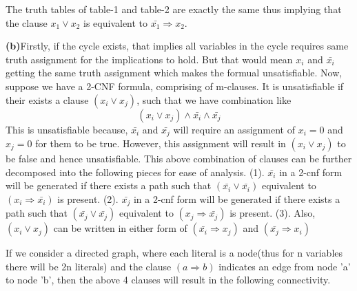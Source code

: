 \documentclass{article}
\renewcommand\part[1]{\vspace{.10in}\textbf{(#1)}}
\begin{document}
  The truth tables of table-1 and table-2 are exactly the same thus implying that the clause $x_{1} \vee x_{2}$ is equivalent to $\bar{x_{1}} \Rightarrow x_{2}$. \newline

  \part{b}Firstly, if the cycle exists, that implies all variables in the cycle requires same truth assignment for the implications to hold. But that would mean $x_{i}$ and $\bar{x_{i}}$ getting the same truth assignment which makes the formual unsatisfiable. Now, suppose we have a 2-CNF formula, comprising of m-clauses. It is unsatisfiable if their exists a clause $(x_{i} \vee x_{j})$, such that we have combination like \newline
\begin{equation}
   (x_{i} \vee x_{j})\wedge \bar{x_{i}} \wedge \bar{x_{j}}
\end{equation}
This is unsatisfiable because, $\bar{x_{i}}$ and $\bar{x_{j}}$  will require an assignment of $x_{i}=0$ and $x_{j} = 0$ for them to be true. However, this assignment will result in $(x_{i} \vee x_{j})$ to be false and hence unsatisfiable. This above combination of clauses can be further decomposed into the following pieces for ease of analysis. \newline
	\hspace*{0.5cm} (1). $\bar{x_{i}}$ in a 2-cnf form will be generated if there exists a path such that $(\bar{x_{i}} \vee \bar{x_{i}})$ equivalent to $(x_{i} \Rightarrow \bar{x_{i}})$ is present. \newline
      \hspace*{0.5cm} (2).  $\bar{x_{j}}$ in a 2-cnf form will be generated if there exists a path such that $(\bar{x_{j}} \vee \bar{x_{j}})$ equivalent to $(x_{j} \Rightarrow \bar{x_{j}})$ is present. \newline
	\hspace*{0.5cm} (3). Also, $(x_{i} \vee x_{j})$ can be written in either form of $(\bar{x_{i}} \Rightarrow x_{j})$ and $(\bar{x_{j}} \Rightarrow x_{i})$ \newline

If we consider a directed graph, where each literal is a node(thus for n variables there will be 2n literals) and the clause $(a \Rightarrow b)$ indicates an edge from node 'a' to node 'b', then the above 4 clauses will result in the following connectivity.\newline
\end{document}
